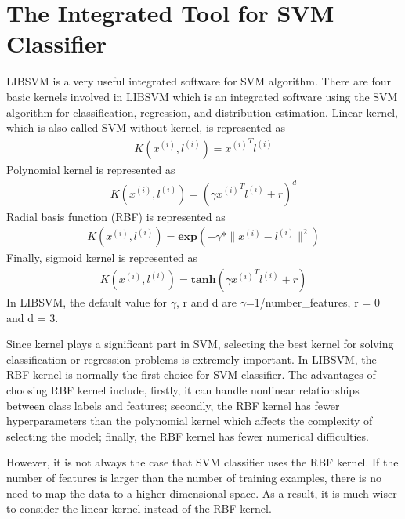 \section{The Integrated Tool for SVM Classifier}
LIBSVM is a very useful integrated software for SVM algorithm\cite{Chang}. There are four basic kernels involved in LIBSVM which is an integrated software using the SVM algorithm for classification, regression, and distribution estimation. Linear kernel, which is also called SVM without kernel, is represented as 
\begin{align*}
K(x^{(i)}, l^{(i)}) = {x^{(i)}}^Tl^{(i)}
\end{align*}
Polynomial kernel is represented as 
\begin{align*}
K(x^{(i)}, l^{(i)}) = (\gamma{x^{(i)}}^Tl^{(i)} + r)^d
\end{align*}
Radial basis function (RBF) is represented as 
\begin{align*}
K(x^{(i)}, l^{(i)}) = \textbf{exp}(-\gamma*\|x^{(i)} - l^{(i)}\|^2)
\end{align*}
Finally, sigmoid kernel is represented as 
\begin{align*}
K(x^{(i)}, l^{(i)}) = \textbf{tanh}(\gamma{x^{(i)}}^Tl^{(i)} + r)
\end{align*}
In LIBSVM, the default value for $\gamma$, r and d are $\gamma$=1/number\_features, r = 0 and d = 3. 
\par
Since kernel plays a significant part in SVM, selecting the best kernel for solving classification or regression problems is extremely important. In LIBSVM, the RBF kernel is normally the first choice for SVM classifier. The advantages of choosing RBF kernel include, firstly, it can handle nonlinear relationships between class labels and features; secondly, the RBF kernel has fewer hyperparameters than the polynomial kernel which affects the complexity of selecting the model; finally, the RBF kernel has fewer numerical difficulties.
\par
However, it is not always the case that SVM classifier uses the RBF kernel. If the number of features is larger than the number of training examples, there is no need to map the data to a higher dimensional space. As a result, it is much wiser to consider the linear kernel instead of the RBF kernel. \par

